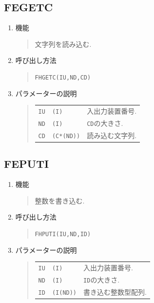 \subsection{FEGETC}
\begin{enumerate}
  \item 機能 
  \begin{quote}
   文字列を読み込む.
  \end{quote}
  \item 呼び出し方法 
  \begin{quote}
    {\tt FHGETC(IU,ND,CD)}
  \end{quote}
  \item パラメーターの説明 
  \begin{quote}
    \begin{tabular}{llp{10cm}}
      {\tt IU}   & {\tt (I)} & 入出力装置番号. \\
      {\tt ND}   & {\tt (I)} & {\tt CD}の大きさ.\\
      {\tt CD}   & {\tt (C*(ND))} & 読み込む文字列.
    \end{tabular}
  \end{quote}
\end{enumerate}

\subsection{FEPUTI}
\begin{enumerate}
  \item 機能 
  \begin{quote}
   整数を書き込む.
  \end{quote}
  \item 呼び出し方法 
  \begin{quote}
    {\tt FHPUTI(IU,ND,ID)}
  \end{quote}
  \item パラメーターの説明 
  \begin{quote}
    \begin{tabular}{llp{10cm}}
      {\tt IU}   & {\tt (I)} & 入出力装置番号. \\
      {\tt ND}   & {\tt (I)} & {\tt ID}の大きさ.\\
      {\tt ID}   & {\tt (I(ND))} & 書き込む整数型配列.
    \end{tabular}
  \end{quote}
\end{enumerate}

